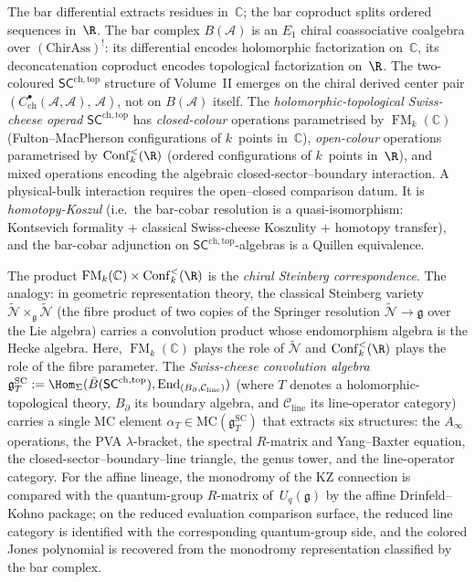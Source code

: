 \documentclass[11pt]{report}
\theoremstyle{definition}
\theoremstyle{remark}
\providecommand{\cA}{\mathcal{A}}
\providecommand{\barB}{\bar{B}}
\providecommand{\C}{\mathbb{C}}
\numberwithin{equation}{section}
\begin{document}
The bar differential extracts residues in~$\C$; the bar coproduct
splits ordered sequences in~$\R$. The bar complex $B(\cA)$ is an
$E_1$ chiral coassociative coalgebra over $(\mathrm{ChirAss})^!$:
its differential encodes holomorphic factorization on~$\C$, its
deconcatenation coproduct encodes topological factorization
on~$\R$. The two-coloured $\mathsf{SC}^{\mathrm{ch,top}}$ structure
of Volume~II emerges on the chiral derived center pair
$(C^\bullet_{\mathrm{ch}}(\cA,\cA),\, \cA)$, not on $B(\cA)$ itself.
The \emph{holomorphic-topological Swiss-cheese
operad} $\mathsf{SC}^{\mathrm{ch,top}}$ has
\emph{closed-colour} operations parametrised by
$\operatorname{FM}_k(\C)$ (Fulton--MacPherson
configurations of $k$~points in~$\C$),
\emph{open-colour} operations parametrised by
$\operatorname{Conf}_k^{<}(\R)$
(ordered configurations of $k$~points in~$\R$), and
mixed operations encoding the algebraic closed-sector--boundary
interaction. A physical-bulk interaction requires the open--closed
comparison datum. It is \emph{homotopy-Koszul}
(i.e.\ the bar-cobar resolution is a quasi-isomorphism:
Kontsevich formality + classical Swiss-cheese Koszulity +
homotopy transfer), and the bar-cobar adjunction on
$\mathsf{SC}^{\mathrm{ch,top}}$-algebras is a Quillen
equivalence.

The product $\operatorname{FM}_k(\C) \times
\operatorname{Conf}_k^{<}(\R)$ is the \emph{chiral
Steinberg correspondence}. The analogy: in geometric
representation theory, the classical Steinberg variety
$\widetilde{\mathcal{N}} \times_{\mathfrak{g}}
\widetilde{\mathcal{N}}$
(the fibre product of two copies of the Springer
resolution $\widetilde{\mathcal{N}} \to
\mathfrak{g}$ over the Lie algebra) carries a
convolution product whose endomorphism algebra is the
Hecke algebra. Here, $\operatorname{FM}_k(\C)$ plays
the role of $\widetilde{\mathcal{N}}$ and
$\operatorname{Conf}_k^{<}(\R)$ plays the role of the
fibre parameter. The \emph{Swiss-cheese convolution
algebra} $\mathfrak{g}^{\mathrm{SC}}_T
:= \Hom_\Sigma(\barB(\mathsf{SC}^{\mathrm{ch,top}}),
\operatorname{End}_{(B_\partial, \mathcal{C}_{\mathrm{line}})})$
(where $T$ denotes a holomorphic-topological theory,
$B_\partial$ its boundary algebra, and
$\mathcal{C}_{\mathrm{line}}$ its line-operator
category) carries a single MC element
$\alpha_T \in
\mathrm{MC}(\mathfrak{g}^{\mathrm{SC}}_T)$
that extracts six structures: the
$A_\infty$ operations, the PVA $\lambda$-bracket, the spectral
$R$-matrix and Yang--Baxter equation, the
closed-sector--boundary--line triangle, the genus tower, and the
line-operator category. For the
affine lineage, the monodromy of the KZ connection is compared with
the quantum-group $R$-matrix of~$U_q(\mathfrak{g})$ by the affine
Drinfeld--Kohno package; on the reduced evaluation comparison
surface, the reduced line category is identified with the
corresponding quantum-group side, and the colored Jones polynomial
is recovered from the monodromy representation classified by the bar
complex.
\end{document}
